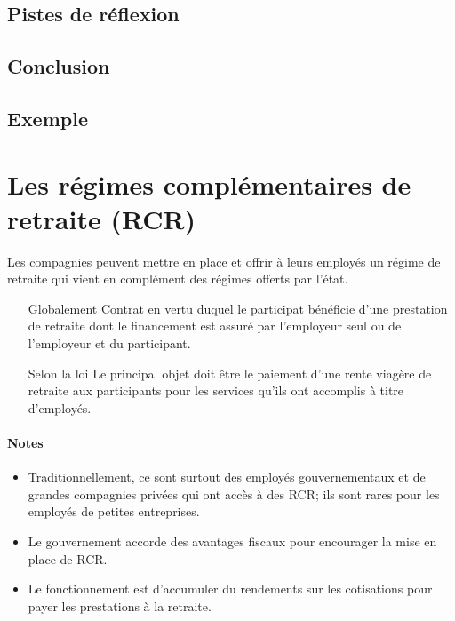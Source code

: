 \documentclass[10pt, french]{article}
\begin{document}
\begin{multicols*}{3}
\subsection*{Pistes de réflexion}

\subsection*{Conclusion}

\subsection*{Exemple}

\newpage

\section{Les régimes complémentaires de retraite (RCR)}

Les compagnies peuvent mettre en place et offrir à leurs employés un régime de retraite qui vient en complément des régimes offerts par l'état. 

\begin{definitionNOHFILL}

	\begin{itemize}
	\item[Globalement] Contrat en vertu duquel le participat bénéficie d'une prestation de retraite dont le financement est assuré par l'employeur seul ou de l'employeur et du participant.
	\item[Selon la loi] Le principal objet doit être le paiement d'une rente viagère de retraite aux participants pour les services qu'ils ont accomplis à titre d'employés.
	\end{itemize}

\paragraph{Notes}
\begin{itemize}[leftmargin = *]
	\item	Traditionnellement, ce sont surtout des employés gouvernementaux et de grandes compagnies privées qui ont accès à des RCR; ils sont rares pour les employés de petites entreprises.
	\item	Le gouvernement accorde des avantages fiscaux pour encourager la mise en place de RCR.
	\item	Le fonctionnement est d'accumuler du rendements sur les cotisations pour payer les prestations à la retraite.
\end{itemize}
\end{definitionNOHFILL}


\end{multicols*}
\end{document}
